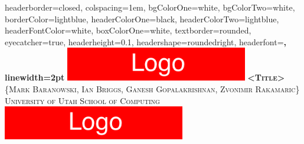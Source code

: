 \documentclass[landscape,a0paper,fontscale=0.285]{baposter} %
\begin{document}
\begin{poster}
{
headerborder=closed, %
colspacing=1em, %
bgColorOne=white, %
bgColorTwo=white, %
borderColor=lightblue, %
headerColorOne=black, %
headerColorTwo=lightblue, %
headerFontColor=white, %
boxColorOne=white, %
textborder=rounded,
eyecatcher=true, %
headerheight=0.1\textheight, %
headershape=roundedright,
headerfont=\Large\bf\textsc, %
linewidth=2pt %
}
{\includegraphics[height=4em]{left_logo}} %
{\bf\textsc{<Title>}\vspace{0.5em}} %
{\textsc{ {\large \{Mark Baranowski, Ian Briggs, Ganesh Gopalakrishnan, Zvonimir Rakamaric\}}
    \hspace{12pt} University of Utah School of Computing}} %
{\includegraphics[height=4em]{right_logo}} %












\end{poster}
\end{document}
